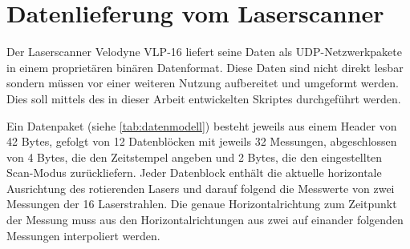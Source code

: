 \documentclass[a4paper,12pt,bibliography=totoc, listof=totoc,titlepage,pointlessnumbers]{scrreprt}
\begin{document}
\section{Datenlieferung vom Laser\-scan\-ner}
\label{ss:Datenlieferung}
Der Laser\-scan\-ner Velodyne VLP-16 liefert seine Daten als UDP-Netzwerkpakete in einem proprietären binären Datenformat. Diese Daten sind nicht direkt lesbar sondern müssen vor einer weiteren Nutzung aufbereitet und umgeformt werden. Dies soll mittels des in dieser Arbeit entwickelten Skriptes durchgeführt werden.

Ein Datenpaket (siehe \autoref{tab:datenmodell}) besteht jeweils aus einem Header von 42 Bytes, gefolgt von 12 Datenblöcken mit jeweils 32 Messungen, abgeschlossen von 4 Bytes, die den Zeitstempel angeben und 2 Bytes, die den eingestellten Scan-Modus zurückliefern. Jeder Datenblock enthält die aktuelle horizontale Ausrichtung des rotierenden Lasers und darauf folgend die Messwerte von zwei Messungen der 16 Laserstrahlen. Die genaue Horizontalrichtung zum Zeitpunkt der Messung muss aus den Horizontalrichtungen aus zwei auf einander folgenden Messungen interpoliert werden.
\end{document}
